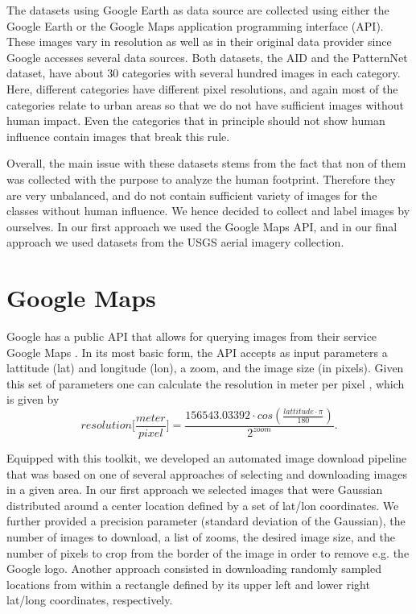 The datasets using Google Earth as data source are collected using either the Google Earth or the Google Maps application programming interface (API). These images vary in resolution as well as in their original data provider since Google accesses several data sources. 
Both datasets, the AID and the PatternNet dataset, have about 30 categories with several hundred images in each category. Here, different categories have different pixel resolutions, and again most of the categories relate to urban areas so that we do not have sufficient images without human impact. Even the categories that in principle should not show human influence contain images that break this rule.

Overall, the main issue with these datasets stems from the fact that non of them was collected with the purpose to analyze the human footprint. Therefore they are very unbalanced, and do not contain sufficient variety of images for the classes without human influence. We hence decided to collect and label images by ourselves. In our first approach we used the Google Maps API, and in our final approach we used datasets from the USGS aerial imagery collection.

\section{Google Maps}

Google has a public API that allows for querying images from their service Google Maps \parencite{google_maps_api}. In its most basic form, the API accepts as input parameters a lattitude (lat) and longitude (lon), a zoom, and the image size (in pixels). Given this set of parameters one can calculate the resolution in meter per pixel \parencite{gmaps_res_per_m}, which is given by
\begin{equation}
resolution \Big[\frac{meter}{pixel}\Big] = \frac{156543.03392 \cdot cos(\frac{lattitude \cdot \pi}{180})}{2 ^ {zoom}}.
\label{eq:gmaps_res_per_m}
\end{equation}

Equipped with this toolkit, we developed an automated image download pipeline that was based on one of several approaches of selecting and downloading images in a given area. In our first approach we selected images that were Gaussian distributed around a center location defined by a set of lat/lon coordinates. We further provided a precision parameter (standard deviation of the Gaussian), the number of images to download, a list of zooms, the desired image size, and the number of pixels to crop from the border of the image in order to remove e.g. the Google logo. Another approach consisted in downloading randomly sampled locations from within a rectangle defined by its upper left and lower right lat/long coordinates, respectively.

